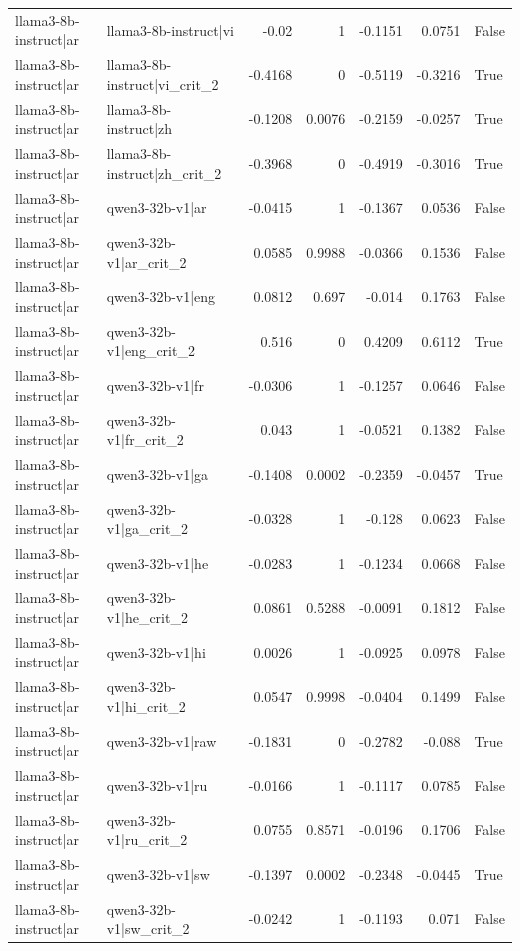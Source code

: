 \begin{table}
\begin{tabular}{l l r r r r l}
llama3-8b-instruct|ar & llama3-8b-instruct|vi & -0.02 & 1 & -0.1151 & 0.0751 & False \\
llama3-8b-instruct|ar & llama3-8b-instruct|vi_crit_2 & -0.4168 & 0 & -0.5119 & -0.3216 & True \\
llama3-8b-instruct|ar & llama3-8b-instruct|zh & -0.1208 & 0.0076 & -0.2159 & -0.0257 & True \\
llama3-8b-instruct|ar & llama3-8b-instruct|zh_crit_2 & -0.3968 & 0 & -0.4919 & -0.3016 & True \\
llama3-8b-instruct|ar & qwen3-32b-v1|ar & -0.0415 & 1 & -0.1367 & 0.0536 & False \\
llama3-8b-instruct|ar & qwen3-32b-v1|ar_crit_2 & 0.0585 & 0.9988 & -0.0366 & 0.1536 & False \\
llama3-8b-instruct|ar & qwen3-32b-v1|eng & 0.0812 & 0.697 & -0.014 & 0.1763 & False \\
llama3-8b-instruct|ar & qwen3-32b-v1|eng_crit_2 & 0.516 & 0 & 0.4209 & 0.6112 & True \\
llama3-8b-instruct|ar & qwen3-32b-v1|fr & -0.0306 & 1 & -0.1257 & 0.0646 & False \\
llama3-8b-instruct|ar & qwen3-32b-v1|fr_crit_2 & 0.043 & 1 & -0.0521 & 0.1382 & False \\
llama3-8b-instruct|ar & qwen3-32b-v1|ga & -0.1408 & 0.0002 & -0.2359 & -0.0457 & True \\
llama3-8b-instruct|ar & qwen3-32b-v1|ga_crit_2 & -0.0328 & 1 & -0.128 & 0.0623 & False \\
llama3-8b-instruct|ar & qwen3-32b-v1|he & -0.0283 & 1 & -0.1234 & 0.0668 & False \\
llama3-8b-instruct|ar & qwen3-32b-v1|he_crit_2 & 0.0861 & 0.5288 & -0.0091 & 0.1812 & False \\
llama3-8b-instruct|ar & qwen3-32b-v1|hi & 0.0026 & 1 & -0.0925 & 0.0978 & False \\
llama3-8b-instruct|ar & qwen3-32b-v1|hi_crit_2 & 0.0547 & 0.9998 & -0.0404 & 0.1499 & False \\
llama3-8b-instruct|ar & qwen3-32b-v1|raw & -0.1831 & 0 & -0.2782 & -0.088 & True \\
llama3-8b-instruct|ar & qwen3-32b-v1|ru & -0.0166 & 1 & -0.1117 & 0.0785 & False \\
llama3-8b-instruct|ar & qwen3-32b-v1|ru_crit_2 & 0.0755 & 0.8571 & -0.0196 & 0.1706 & False \\
llama3-8b-instruct|ar & qwen3-32b-v1|sw & -0.1397 & 0.0002 & -0.2348 & -0.0445 & True \\
llama3-8b-instruct|ar & qwen3-32b-v1|sw_crit_2 & -0.0242 & 1 & -0.1193 & 0.071 & False \\

\end{tabular}
\end{table}
